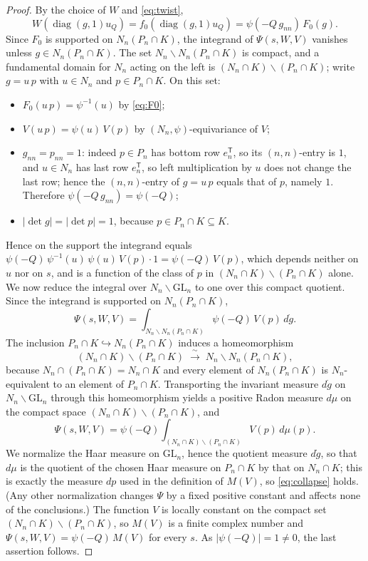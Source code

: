 \documentclass[12pt]{article}
\newcommand{\GL}{\mathrm{GL}}
\newcommand{\diag}{\operatorname{diag}}
\begin{document}
\begin{proof}
By the choice of $W$ and \eqref{eq:twist},
\[
  W(\diag(g,1)u_Q)=f_0(\diag(g,1)u_Q)=\psi(-Q\,g_{nn})\,F_0(g).
\]
Since $F_0$ is supported on $N_n(P_n\cap K)$, the integrand of $\Psi(s,W,V)$ vanishes
unless $g\in N_n(P_n\cap K)$. The set $N_n\backslash N_n(P_n\cap K)$ is compact, and
a fundamental domain for $N_n$ acting on the left is $(N_n\cap K)\backslash(P_n\cap K)$;
write $g=u\,p$ with $u\in N_n$ and $p\in P_n\cap K$. On this set:
\begin{itemize}
\item $F_0(u\,p)=\psi^{-1}(u)$ by \eqref{eq:F0};
\item $V(u\,p)=\psi(u)\,V(p)$ by $(N_n,\psi)$-equivariance of $V$;
\item $g_{nn}=p_{nn}=1$: indeed $p\in P_n$ has bottom row $e_n^{\mathsf T}$, so its
$(n,n)$-entry is $1$, and $u\in N_n$ has last row $e_n^{\mathsf T}$, so left
multiplication by $u$ does not change the last row; hence the $(n,n)$-entry of
$g=u\,p$ equals that of $p$, namely $1$. Therefore
$\psi(-Q\,g_{nn})=\psi(-Q)$;
\item $|\det g|=|\det p|=1$, because $p\in P_n\cap K\subseteq K$.
\end{itemize}
Hence on the support the integrand equals
$\psi(-Q)\,\psi^{-1}(u)\,\psi(u)\,V(p)\cdot1=\psi(-Q)\,V(p)$, which depends neither
on $u$ nor on $s$, and is a function of the class of $p$ in
$(N_n\cap K)\backslash(P_n\cap K)$ alone. We now reduce the integral over
$N_n\backslash\GL_n$ to one over this compact quotient. Since the integrand is
supported on $N_n(P_n\cap K)$,
\[
  \Psi(s,W,V)=\int_{N_n\backslash N_n(P_n\cap K)}\psi(-Q)\,V(p)\,d\dot g .
\]
The inclusion $P_n\cap K\hookrightarrow N_n(P_n\cap K)$ induces a homeomorphism
\[
  (N_n\cap K)\backslash(P_n\cap K)\;\xrightarrow{\ \sim\ }\;
  N_n\backslash N_n(P_n\cap K),
\]
because $N_n\cap(P_n\cap K)=N_n\cap K$ and every element of $N_n(P_n\cap K)$ is
$N_n$-equivalent to an element of $P_n\cap K$. Transporting the invariant measure
$d\dot g$ on $N_n\backslash\GL_n$ through this homeomorphism yields a positive Radon
measure $d\mu$ on the compact space $(N_n\cap K)\backslash(P_n\cap K)$, and
\[
  \Psi(s,W,V)=\psi(-Q)\int_{(N_n\cap K)\backslash(P_n\cap K)}V(p)\,d\mu(p).
\]
We normalize the Haar measure on $\GL_n$, hence the quotient measure $d\dot g$, so
that $d\mu$ is the quotient of the chosen Haar measure on $P_n\cap K$ by that on
$N_n\cap K$; this is exactly the measure $dp$ used in the definition of $M(V)$, so
\eqref{eq:collapse} holds. (Any other normalization changes $\Psi$ by a fixed
positive constant and affects none of the conclusions.) The function $V$ is locally
constant on the compact set $(N_n\cap K)\backslash(P_n\cap K)$, so $M(V)$ is a finite
complex number and $\Psi(s,W,V)=\psi(-Q)\,M(V)$ for every $s$. As $|\psi(-Q)|=1\neq0$,
the last assertion follows.
\end{proof}
\end{document}
